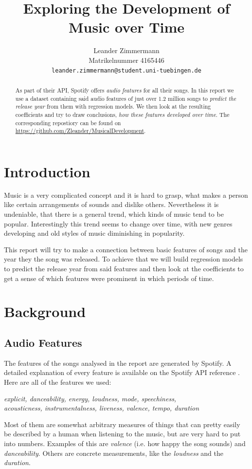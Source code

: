 \documentclass{article}
\title{Exploring the Development of Music over Time}
\author{%
  Leander Zimmermann\\
  Matrikelnummer 4165446\\
  \texttt{leander.zimmermann@student.uni-tuebingen.de} \\
}
\begin{document}
\maketitle

\begin{abstract}
    As part of their API, Spotify offers \emph{audio features} for all their songs. In this report we use a dataset containing said audio features of just over 1.2 million songs to \emph{predict the release year} from them with regression models. We then look at the resulting coefficients and try to draw conclusions, \emph{how these features developed over time}. The corresponding repostiory can be found on \url{https://github.com/Zleander/MusicalDevelopment}.
\end{abstract}

\section{Introduction}

Music is a very complicated concept and it is hard to grasp, what makes a person like certain arrangements of sounds and dislike others. Nevertheless it is undeniable, that there is a general trend, which kinds of music tend to be popular. Interestingly this trend seems to change over time, with new genres developing and old styles of music diminishing in popularity.

This report will try to make a connection between basic features of songs and the year they the song was released. To achieve that we will build regression models to predict the release year from said features and then look at the coefficients to get a sense of which features were prominent in which periods of time.

\section{Background}
\subsection{Audio Features}\label{sec:features}
The features of the songs analysed in the report are generated by Spotify. A detailed explanation of every feature is available on the Spotify API reference \citep{spotify_audio_features}.
Here are all of the features we used: 
\begin{center}
  \emph{explicit, danceability, energy, loudness, mode, speechiness, \\ acousticness, instrumentalness, liveness, valence, tempo, duration}
\end{center}
Most of them are somewhat arbitrary measures of things that can pretty easily be described by a human when listening to the music, but are very hard to put into numbers. Examples of this are \emph{valence} (i.e. how happy the song sounds) and \emph{danceability}. Others are concrete measurements, like the \emph{loudness} and the \emph{duration}. 
\end{document}

